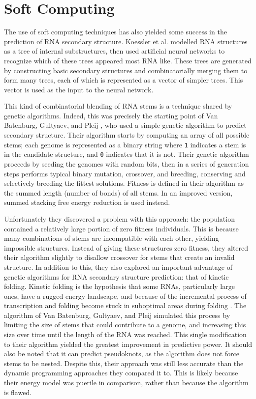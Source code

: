 \documentclass{cshonours}
\begin{document}
\section{Soft Computing}
The use of soft computing techniques has also yielded some success in the prediction of RNA secondary structure. Koessler et al. \cite{koessler2010predictive} modelled RNA structures
as a tree of internal substructures, then used artificial neural networks to recognize
which of these trees appeared most RNA like. These trees are generated by constructing basic secondary structures and combinatorially merging them to form many trees, each of which is represented as a vector of simpler trees.
This vector is used as the input to the neural network. 

This kind of combinatorial blending of RNA stems is a technique shared by genetic algorithms. Indeed, this
was precisely the starting point of Van Batenburg, Gultyaev, and Pleij \cite{van1995apl}, who
used a simple genetic algorithm to predict secondary structure. Their algorithm
starts by computing an array of all possible stems; each genome is represented
as a binary string where \texttt{1} indicates a stem is in the candidate structure, and \texttt{0}
indicates that it is not. Their genetic algorithm proceeds by seeding the genomes
with random bits, then in a series of generation steps performs typical binary
mutation, crossover, and breeding, conserving and selectively breeding the fittest
solutions. Fitness is defined in their algorithm as the summed length
(number of bonds) of all stems. In an improved version, summed stacking
free energy reduction is used instead.

Unfortunately they discovered a problem with this approach: the population
contained a relatively large portion of zero fitness individuals. This is because
many combinations of stems are incompatible with each other, yielding impossible
structures. Instead of giving these structures zero fitness, they altered their algorithm slightly to disallow crossover for stems that create an invalid structure.
In addition to this, they also explored an important advantage of genetic algorithms for RNA secondary structure prediction: that of kinetic folding. Kinetic
folding is the hypothesis that some RNAs, particularly large ones, have a rugged
energy landscape, and because of the incremental process of transcription and
folding become stuck in suboptimal areas during
folding \cite{treiber2001beyond, van1995apl}. The algorithm of Van Batenburg, Gultyaev, and Pleij simulated
this process by limiting the size of stems that could contribute to a genome, and
increasing this size over time until the length of the RNA was reached. This
single modification to their algorithm yielded the greatest improvement in predictive power. It should also be noted that it can predict pseudoknots, as
the algorithm does not force stems to be nested. Despite this, their approach was
still less accurate than the dynamic programming approaches they compared it
to. This is likely because their energy model was puerile in comparison, rather than because the algorithm is flawed.
\end{document}
